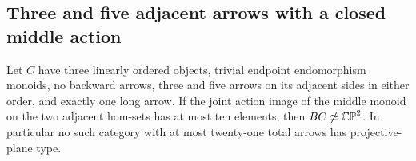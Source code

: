 \subsection{Three and five adjacent arrows with a closed middle action}

\begin{theorem}
\label{C:linear-three-by-five-one-long-21}
Let $C$ have three linearly ordered objects, trivial endpoint
endomorphism monoids, no backward arrows, three and five arrows
on its adjacent sides in either order, and exactly one long arrow.
If the joint action image of the middle monoid on the two adjacent
hom-sets has at most ten elements, then $BC\not\simeq\mathbb {CP}^2$.
In particular no such category with at most twenty-one total
arrows has projective-plane type.
\end{theorem}

